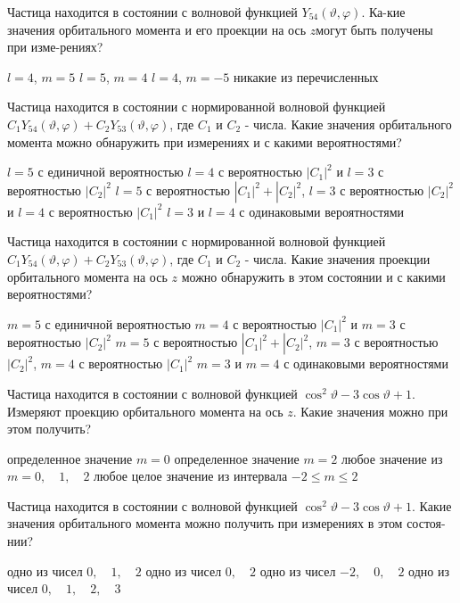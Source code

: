 \documentclass[11pt,a4paper]{exam}
\begin{document}
\begin{questions}
\question Частица находится в состоянии с волновой функцией ${Y_{54}}(\vartheta ,\varphi )$. Ка-кие значения орбитального момента и его проекции на ось $z$могут быть получены при изме-рениях?
\begin{choices}
\choice $l = 4$, $m = 5$  
\choice $l = 5$, $m = 4$  
\choice $l = 4$, $m =  - 5$  
\choice никакие из перечисленных
\end{choices}

\question Частица находится в состоянии с нормированной волновой функцией ${C_1}{Y_{54}}(\vartheta ,\varphi ) + {C_2}{Y_{53}}(\vartheta ,\varphi )$, где ${C_1}$ и ${C_2}$ - числа. Какие значения орбитального момента можно обнаружить при измерениях и с какими вероятностями?
\begin{choices}
\choice $l = 5$ с единичной вероятностью
\choice $l = 4$ с вероятностью $|{C_1}{|^2}$ и $l = 3$ с вероятностью $|{C_2}{|^2}$ 
\choice $l = 5$ с вероятностью $|{C_1}{|^2} + |{C_2}{|^2}$, $l = 3$ с вероятностью $|{C_2}{|^2}$ и $l = 4$ с вероятностью $|{C_1}{|^2}$
\choice $l = 3$ и $l = 4$ с одинаковыми вероятностями
\end{choices}

\question Частица находится в состоянии с нормированной волновой функцией ${C_1}{Y_{54}}(\vartheta ,\varphi ) + {C_2}{Y_{53}}(\vartheta ,\varphi )$, где ${C_1}$ и ${C_2}$ - числа. Какие значения проекции орбитального момента на ось $z$ можно обнаружить в этом состоянии и с какими вероятностями?
\begin{choices}
\choice $m = 5$ с единичной вероятностью
\choice $m = 4$ с вероятностью $|{C_1}{|^2}$ и $m = 3$ с вероятностью $|{C_2}{|^2}$ 
\choice $m = 5$ с вероятностью $|{C_1}{|^2} + |{C_2}{|^2}$, $m = 3$ с вероятностью $|{C_2}{|^2}$, $m = 4$ с вероятностью $|{C_1}{|^2}$
\choice $m = 3$ и $m = 4$ с одинаковыми вероятностями
\end{choices}

\question Частица находится в состоянии с волновой функцией ${\cos ^2}\vartheta  - 3\cos \vartheta  + 1$. Измеряют проекцию орбитального момента на ось $z$. Какие значения можно при этом получить?
\begin{choices}
\choice определенное значение $m = 0$
\choice определенное значение $m = 2$
\choice любое значение из $m = 0,\quad 1,\quad 2$
\choice любое целое значение из интервала $ - 2 \le m \le 2$
\end{choices}

\question Частица находится в состоянии с волновой функцией ${\cos ^2}\vartheta  - 3\cos \vartheta  + 1$. Какие значения орбитального момента можно получить при измерениях в этом состоя-нии?
\begin{choices}
\choice одно из чисел $0,\quad 1,\quad 2$
\choice одно из чисел $0,\quad 2$
\choice одно из чисел $ - 2,\quad 0,\quad 2$
\choice одно из чисел $0,\quad 1,\quad 2,\quad 3$
\end{choices}


\end{questions}
\end{document}
